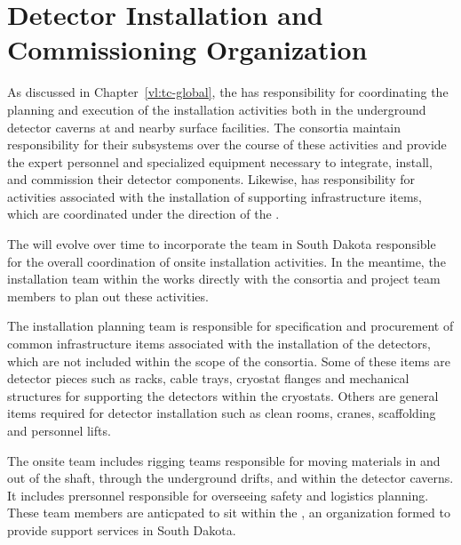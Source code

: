 \chapter{Detector Installation and Commissioning Organization}
\label{ch:tc-jpo}

As discussed in Chapter~\ref{vl:tc-global}, the  has
responsibility for coordinating the planning and execution of 
the  installation activities both 
in the underground detector caverns at  and 
nearby surface facilities.  The  consortia maintain 
responsibility for their subsystems over the course of these 
activities and provide the expert personnel and specialized 
equipment necessary to integrate, install, and commission their 
detector components.  Likewise,  has responsibility 
for activities associated with the installation 
of supporting infrastructure items, which are coordinated under 
the direction of the .       

The  will evolve over time to incorporate the team in South 
Dakota responsible for the overall coordination of onsite
installation activities.  In the meantime, the installation team 
within the  works directly with the  consortia 
and  project team members to plan out these activities.  

The  installation planning team is 
responsible for specification and procurement of common infrastructure 
items associated with the installation of the detectors, 
which are not included within the scope of the  consortia.  
Some of these items are detector pieces such as racks, cable trays, cryostat 
flanges and mechanical structures for supporting the detectors within 
the cryostats.  Others are general items required for detector
installation such as clean rooms, cranes, scaffolding and personnel 
lifts.

The onsite  team includes rigging 
teams responsible for moving materials in and out of the shaft, through the 
underground drifts, and within the detector caverns.  It includes
prersonnel responsible for overseeing safety and logistics planning.  These 
team members are anticpated to sit within the , an organization 
formed to provide  support services in South Dakota.    

